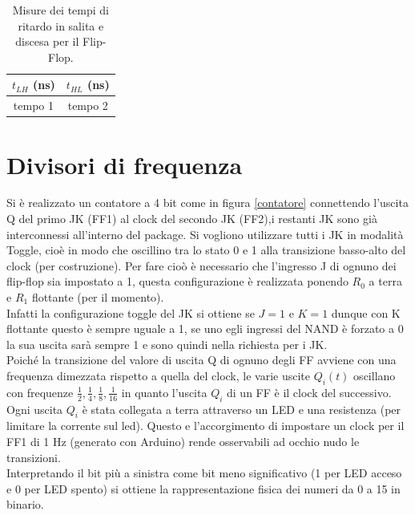 \documentclass[10pt,a4paper]{article}
\begin{document}
\begin{table}[!htb]
\centering
\begin{tabular}{|c|c|}
\hline 
$t_{LH}$ (ns) & $t_{HL}$ (ns)\\
\hline
tempo 1 & tempo 2\\
\hline
\end{tabular}
\caption{Misure dei tempi di ritardo in salita e discesa per il Flip-Flop.\label{ritardo}}
\end{table}


\section{Divisori di frequenza}
Si è realizzato un contatore a 4 bit come in figura \ref{contatore} connettendo l'uscita Q del primo JK (FF1) al clock del secondo JK (FF2),i restanti JK sono già interconnessi all'interno del package. Si vogliono utilizzare tutti i JK in modalità Toggle, cioè in modo che oscillino tra lo stato 0 e 1 alla transizione basso-alto del clock (per costruzione). Per fare cioò è necessario che l'ingresso J di ognuno dei flip-flop sia impostato a 1, questa configurazione è realizzata ponendo $R_0$ a terra e $R_1$ flottante (per il momento).\\
Infatti la configurazione toggle del JK si ottiene se $J = 1$ e $K = 1$ dunque con K flottante questo è sempre uguale a 1, se uno egli ingressi del NAND è forzato a 0 la sua uscita sarà sempre 1 e sono quindi nella richiesta per i JK.\\  
Poiché la transizione del valore di uscita Q di ognuno degli FF avviene con una frequenza dimezzata rispetto a quella del clock, le varie uscite $Q_i(t)$ oscillano con frequenze $\frac{1}{2}, \frac{1}{4}, \frac{1}{8}, \frac{1}{16}$ in quanto l'uscita $Q_i$ di un FF è il clock del successivo.\\
Ogni uscita $Q_i$ è stata collegata a terra attraverso un LED e una resistenza (per limitare la corrente sul led). Questo e l'accorgimento di impostare un clock per il FF1 di 1 Hz (generato con Arduino) rende osservabili ad occhio nudo le transizioni.\\
Interpretando il bit più a sinistra come bit meno significativo (1 per LED acceso e 0 per LED spento) si ottiene la rappresentazione fisica dei numeri da 0 a 15 in binario.\\
\end{document}
